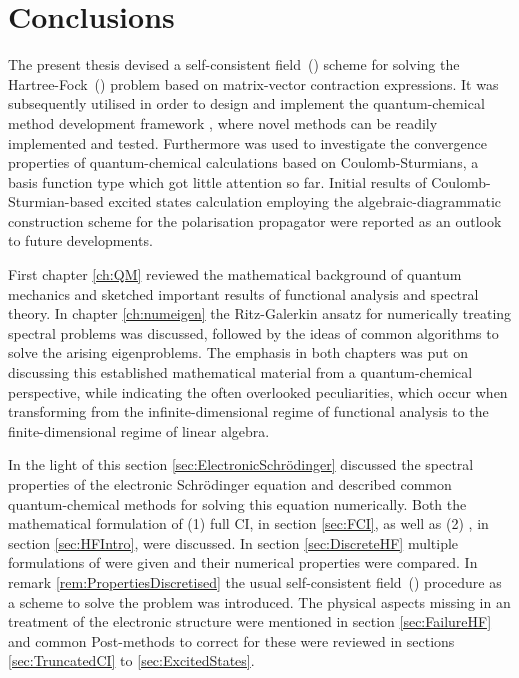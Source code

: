\chapter{Conclusions}
\label{ch:Conclusion}

\noindent
The present thesis devised a self-consistent field~(\SCF)
scheme for solving the Hartree-Fock~(\HF) problem
based on matrix-vector contraction expressions.
It was subsequently utilised in order to design and implement the
quantum-chemical method development framework \molsturm,
where novel methods can be readily implemented and tested.
Furthermore \molsturm was used to investigate the convergence properties
of quantum-chemical calculations
based on Coulomb-Sturmians,
a basis function type which got little attention so far.
Initial results of Coulomb-Sturmian-based excited states
calculation employing the algebraic-diagrammatic construction scheme
for the polarisation propagator were reported
as an outlook to future developments.


First chapter \ref{ch:QM} reviewed the mathematical background of quantum mechanics
and sketched important results of functional analysis
and spectral theory.
In chapter \ref{ch:numeigen} the Ritz-Galerkin ansatz
for numerically treating spectral problems
was discussed, followed by the ideas of common algorithms
to solve the arising eigenproblems.
The emphasis in both chapters
was put on discussing this established mathematical
material from a quantum-chemical perspective,
while indicating the often overlooked peculiarities,
which occur when transforming from the infinite-dimensional regime
of functional analysis to the finite-dimensional regime of linear algebra.


In the light of this section \ref{sec:ElectronicSchrödinger}
discussed the spectral properties
of the electronic Schrödinger equation and
described common quantum-chemical methods
for solving this equation numerically.
Both the mathematical formulation of (1) full CI, in section \ref{sec:FCI},
as well as (2) \HF, in section \ref{sec:HFIntro}, were discussed.
In section \ref{sec:DiscreteHF} multiple formulations of \HF were given
and their numerical properties were compared.
In remark \ref{rem:PropertiesDiscretised}
the usual self-consistent field~(\SCF) procedure
as a scheme to solve the \HF problem was introduced.
The physical aspects missing in an \HF treatment of the electronic
structure were mentioned in section \ref{sec:FailureHF}
and common Post-\HF methods to correct for these were
reviewed in sections \ref{sec:TruncatedCI} to \ref{sec:ExcitedStates}.

